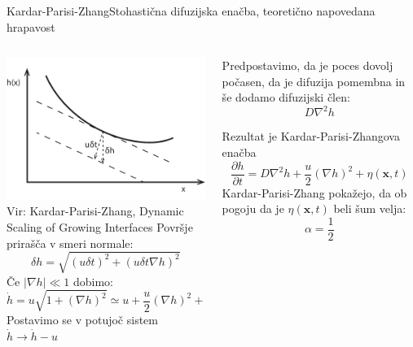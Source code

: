 \documentclass{beamer}
\begin{document}
\begin{frame}{Kardar-Parisi-Zhang}{Stohastična difuzijska enačba, teoretično napovedana hrapavost}
\footnotesize
\begin{columns}
  \begin{column}{0.45\textwidth}
    \includegraphics[width=1\textwidth]{slike/denudacija}
    \tiny{\\ Vir: Kardar-Parisi-Zhang, Dynamic Scaling of Growing Interfaces}
    \newline
    \newline
    Površje prirašča v smeri normale:
    \begin{equation} \delta h = \sqrt{ (u \delta t)^2 + (u \delta t \nabla h)^2} \end{equation}   
    Če $|\nabla h| \ll 1$ dobimo: 
    \begin{equation} \dot h = u \sqrt{1 + (\nabla h)^2} \simeq u + \frac{u}{2} (\nabla h)^2 + \ldots \end{equation}
    Postavimo se v potujoč sistem $\dot h \rightarrow \dot h - u$
    
  \end{column}
  \begin{column}{0.55\textwidth}
    Predpostavimo, da je poces dovolj počasen, da je difuzija pomembna in še dodamo difuzijski člen:
    \begin{equation} D \nabla^2 h \end{equation}
    \newline

    Rezultat je Kardar-Parisi-Zhangova enačba
    \begin{equation} \frac{\partial h}{\partial t} = D \nabla^2 h + \frac{u}{2} (\nabla h)^2 + \eta (\mathbf{x},t) \end{equation}
    \newline
    Kardar-Parisi-Zhang pokažejo, da ob pogoju da je $\eta(\mathbf{x},t)$ beli šum velja:
    \begin{equation} \alpha = \frac{1}{2} \end{equation}
  \end{column}
\end{columns}

\end{frame}
\end{document}
